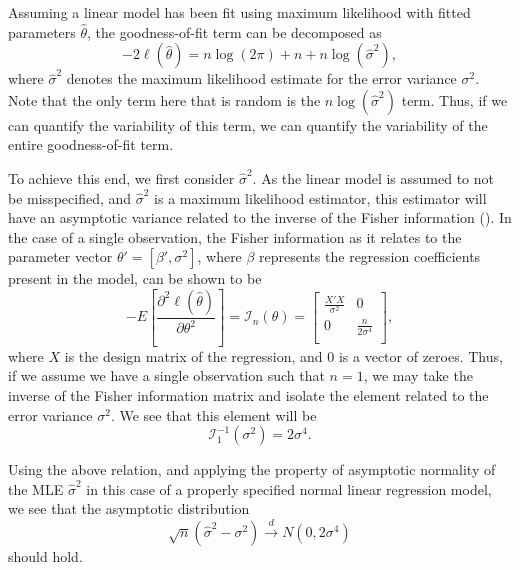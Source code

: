 \documentclass[12pt]{article} %
\theoremstyle{definition}
\begin{document}
		Assuming a linear model has been fit using maximum likelihood with fitted parameters $\hat{\theta}$, the goodness-of-fit term can be decomposed as
		\begin{equation}
			-2 \ell (\hat{\theta}  ) = n \log(2 \pi) + n + n \log(\hat{\sigma}^2 ) ,
		\end{equation}
		where $\hat{\sigma}^2$ denotes the maximum likelihood estimate for the error variance $\sigma^2$. Note that the only term here that is random is
		the $n \log(\hat{\sigma}^2)$ term. Thus, if we can quantify the variability of this term, we can quantify the variability of the entire goodness-of-fit
		term.

		To achieve this end, we first consider $\hat{\sigma}^2$. As the linear model is assumed to not be misspecified, and $\hat{\sigma}^2$ is a maximum likelihood
		estimator, this estimator will have an asymptotic variance related to the inverse of the Fisher information (\cite{Fisher}). In the case of a single
		observation, the Fisher information as it relates to the parameter vector $\theta' = [\beta', \sigma^2]$, where $\beta$ represents the regression coefficients
		present in the model, can be shown to be
		\begin{equation*}
			- E \left[ \frac{\partial^2 \ell (\hat{\theta}  )}{\partial \theta^2} \right] = \mathcal{I}_{n}(\theta) =
			\begin{bmatrix}
				\frac{X' X}{\sigma^2} & 0 \\
				0 & \frac{n}{2 \sigma^4} \\
			\end{bmatrix}
			,
		\end{equation*}
		where $X$ is the design matrix of the regression, and $0$ is a vector of zeroes. Thus, if we assume we have a single observation
		such that $n=1$, we may take the inverse of the Fisher information matrix and isolate the element related to the error variance $\sigma^2$. We see that
		this element will be
		\begin{equation*}
			\mathcal{I}_{1}^{-1}(\sigma ^2) = 2 \sigma ^4 .
		\end{equation*}
		
		Using the above relation, and applying the property of asymptotic normality of the MLE $\hat{\sigma}^2$ in this case of a properly specified normal linear
		regression model, we see that the asymptotic distribution
		\begin{equation*}
			\sqrt{n} (\hat{\sigma}^2 - \sigma^2) \xrightarrow[]{d} N(0, 2 \sigma ^4 )
		\end{equation*}
		should hold.
\end{document}
